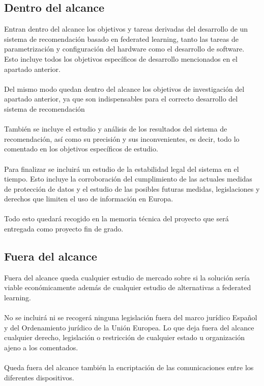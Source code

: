 \subsection{Dentro del alcance}
Entran dentro del alcance los objetivos y tareas derivadas del desarrollo de un sistema de recomendación basado en federated learning, tanto las tareas de parametrización y configuración del hardware como el desarrollo de software. Esto incluye todos los objetivos específicos de desarrollo mencionados en el apartado anterior.
\\ \\
Del mismo modo quedan dentro del alcance los objetivos de investigación del apartado anterior, ya que son indispensables para el correcto desarrollo del sistema de recomendación
\\ \\
También se incluye el estudio y análisis de los resultados del sistema de recomendación, así como su precisión y sus inconvenientes, es decir, todo lo comentado en los objetivos específicos de estudio.
\\ \\
Para finalizar se incluirá un estudio de la estabilidad legal del sistema en el tiempo. Esto incluye la corroboración del cumplimiento de las actuales medidas de protección de datos y el estudio de las posibles futuras medidas, legislaciones y derechos que limiten el uso de información en Europa.
\\ \\
Todo esto quedará recogido en la memoria técnica del proyecto que será entregada como proyecto fin de grado.

\subsection{Fuera del alcance}
Fuera del alcance queda cualquier estudio de mercado sobre si la solución sería viable económicamente además de cualquier estudio de alternativas a federated learning. 
\\ \\
No se incluirá ni se recogerá ninguna legislación fuera del marco jurídico Español y del Ordenamiento jurídico de la Unión Europea. Lo que deja fuera del alcance cualquier derecho, legislación o restricción de cualquier estado u organización ajeno a los comentados.
\\ \\
Queda fuera del alcance también la encriptación de las comunicaciones entre los diferentes dispositivos.
\\